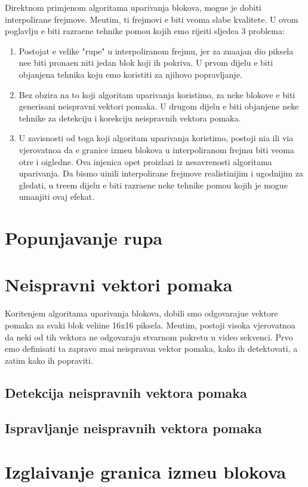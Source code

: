 Direktnom primjenom algoritama uparivanja blokova, mogu\cj e je dobiti interpolirane frejmove. Me\dj utim, ti frejmovi \cj e biti veoma slabe kvalitete. U ovom poglavlju \cj e biti razra\dj ene tehnike pomo\cj u kojih
\cj emo rije\sh iti sljede\cj a 3 problema:
\begin{enumerate}
	\item Postojat \cj e velike "rupe" u interpoliranom frejmu, jer za zna\ch ajan dio piksela ne\cj e biti prona\dj en niti jedan blok koji ih pokriva. U prvom dijelu \cj e biti obja\sh njena tehnika koju \cj emo koristiti
	za njihovo popravljanje.
	\item Bez obzira na to koji algoritam uparivanja koristimo, za neke blokove \cj e biti generisani neispravni vektori pomaka. U drugom dijelu \cj e biti obja\sh njene neke tehnike za detekciju i korekciju
	neispravnih vektora pomaka.
	\item U zavisnosti od toga koji algoritam uparivanja koristimo, postoji ni\zh a ili vi\sh a vjerovatno\cj a da \cj e granice izme\dj u blokova u interpoliranom frejmu biti veoma o\sh tre i o\ch igledne. Ova 
	\ch injenica opet proizlazi iz nesavr\sh enosti algoritama uparivanja. Da bismo u\ch inili interpolirane frejmove realisti\ch nijim i ugodnijim za gledati, u tre\cj em dijelu \cj e biti razra\dj ene neke tehnike pomo\cj u kojih je
	mogu\cj e umanjiti ovaj efekat.
\end{enumerate}

\section{Popunjavanje rupa}

\section{Neispravni vektori pomaka}
Kori\sh tenjem algoritama uparivanja blokova, dobili smo odgovaraju\cj e vektore pomaka za svaki blok veli\ch ine 16x16 piksela. Me\dj utim, postoji visoka vjerovatno\cj a da neki od tih vektora ne odgovaraju stvarnom pokretu
u video sekvenci. Prvo \cj emo definisati \sh ta zapravo zna\ch i neispravan vektor pomaka, kako ih detektovati, a zatim kako ih popraviti.

\subsection{Detekcija neispravnih vektora pomaka}

\subsection{Ispravljanje neispravnih vektora pomaka}

\section{Izgla\dj ivanje granica izme\dj u blokova}